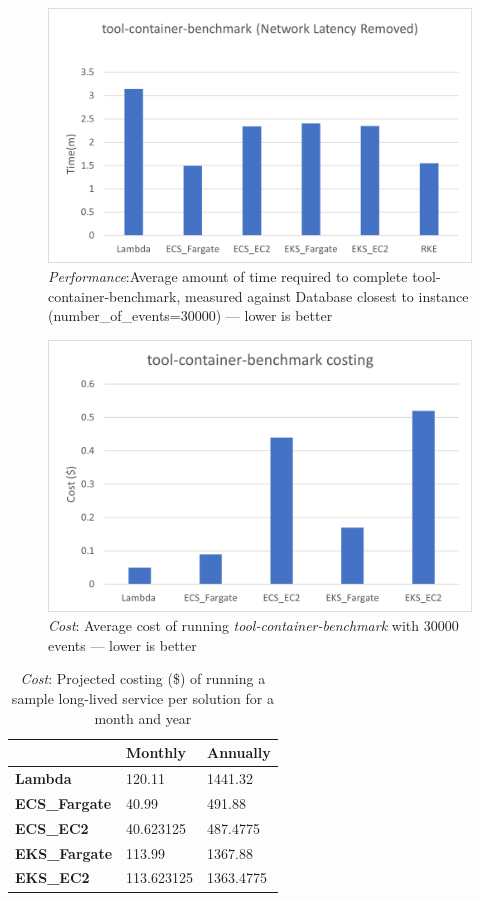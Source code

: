 \begin{figure}[hp]
  \includegraphics{images/perf-tcb_network.png}
  \caption{\emph{Performance}:Average amount of time required to complete tool-container-benchmark, measured against Database closest to instance (number\_of\_events=30000) --- lower is better}
  \label{fig:perf_tcb_network}
\end{figure}

\begin{figure}[hp]
  \includegraphics{images/cost-workload.png}
  \caption{\emph{Cost}: Average cost of running \emph{tool-container-benchmark} with 30000 events --- lower is better}
  \label{fig:cost_workload}
\end{figure}

\begin{table}[hp]
  \caption{\emph{Cost}: Projected costing (\$) of running a sample long-lived service per solution for a month and year}
  \small
  \begin{tabularx}{1\textwidth}{X | X | X }
    \space            & \bf{Monthly} & \bf{Annually} \\
    \hline
    \bf{Lambda      } & 120.11       & 1441.32       \\
    \bf{ECS\_Fargate} & 40.99        & 491.88        \\
    \bf{ECS\_EC2    } & 40.623125    & 487.4775      \\
    \bf{EKS\_Fargate} & 113.99       & 1367.88       \\
    \bf{EKS\_EC2    } & 113.623125   & 1363.4775     \\
  \end{tabularx}
  \label{fig:cost_projected}
\end{table}

